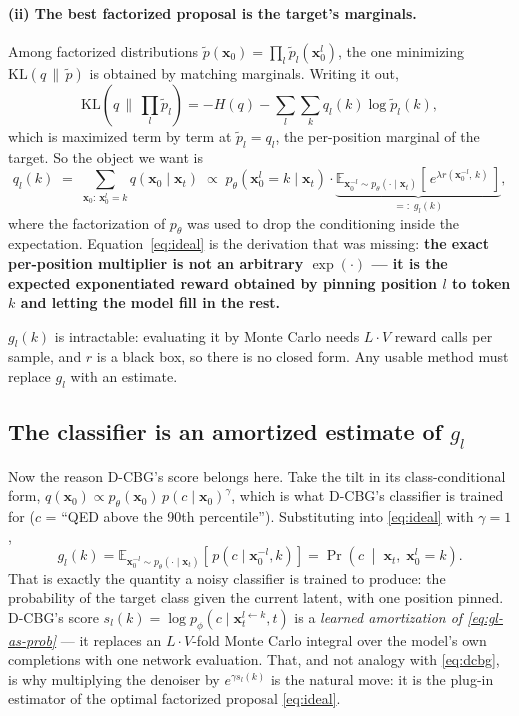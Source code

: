 \documentclass[11pt]{article}
\newcommand{\x}{\mathbf{x}}
\begin{document}
\paragraph{(ii) The best factorized proposal is the target's marginals.} Among
factorized distributions $\tilde{p}(\x_0) = \prod_l \tilde{p}_l(\x_0^l)$, the
one minimizing $\mathrm{KL}(q \,\|\, \tilde{p})$ is obtained by matching
marginals. Writing it out,
\begin{equation}
\mathrm{KL}(q \,\|\, \textstyle\prod_l \tilde{p}_l)
 = -H(q) - \sum_{l}\sum_{k} q_l(k) \log \tilde{p}_l(k),
\end{equation}
which is maximized term by term at $\tilde{p}_l = q_l$, the per-position
marginal of the target. So the object we want is
\begin{equation}
q_l(k) \;=\; \sum_{\x_0 : \, \x_0^l = k} q(\x_0 \mid \x_t)
      \;\propto\; p_\theta\!\left(\x_0^l = k \mid \x_t\right)
       \cdot \underbrace{\mathbb{E}_{\x_0^{-l} \sim p_\theta(\cdot \mid \x_t)}
         \!\left[\, e^{\lambda r(\x_0^{-l},\, k)} \,\right]}_{
         \textstyle =:\; g_l(k)},
\label{eq:ideal}
\end{equation}
where the factorization of $p_\theta$ was used to drop the conditioning inside
the expectation. Equation~\eqref{eq:ideal} is the derivation that was missing:
\textbf{the exact per-position multiplier is not an arbitrary
$\exp(\cdot)$ --- it is the expected exponentiated reward obtained by pinning
position $l$ to token $k$ and letting the model fill in the rest.}

$g_l(k)$ is intractable: evaluating it by Monte Carlo needs $L \cdot V$ reward
calls per sample, and $r$ is a black box, so there is no closed form. Any usable
method must replace $g_l$ with an estimate.

\subsection{The classifier is an amortized estimate of \texorpdfstring{$g_l$}{g\_l}}

Now the reason D-CBG's score belongs here. Take the tilt in its
class-conditional form, $q(\x_0) \propto p_\theta(\x_0)\, p(c \mid \x_0)^\gamma$,
which is what D-CBG's classifier is trained for ($c$ = ``QED above the 90th
percentile''). Substituting into \eqref{eq:ideal} with $\gamma = 1$,
\begin{equation}
g_l(k)
 = \mathbb{E}_{\x_0^{-l} \sim p_\theta(\cdot \mid \x_t)}
   \!\left[\, p\!\left(c \mid \x_0^{-l}, k\right) \right]
 = \Pr\!\left(c \;\middle|\; \x_t,\; \x_0^l = k\right).
\label{eq:gl-as-prob}
\end{equation}
That is exactly the quantity a noisy classifier is trained to produce: the
probability of the target class given the current latent, with one position
pinned. D-CBG's score $s_l(k) = \log p_\phi(c \mid \x_t^{l \leftarrow k}, t)$ is
a \emph{learned amortization of \eqref{eq:gl-as-prob}} --- it replaces an
$L \cdot V$-fold Monte Carlo integral over the model's own completions with one
network evaluation. That, and not analogy with \eqref{eq:dcbg}, is why
multiplying the denoiser by $e^{\gamma s_l(k)}$ is the natural move: it is the
plug-in estimator of the optimal factorized proposal \eqref{eq:ideal}.
\end{document}
